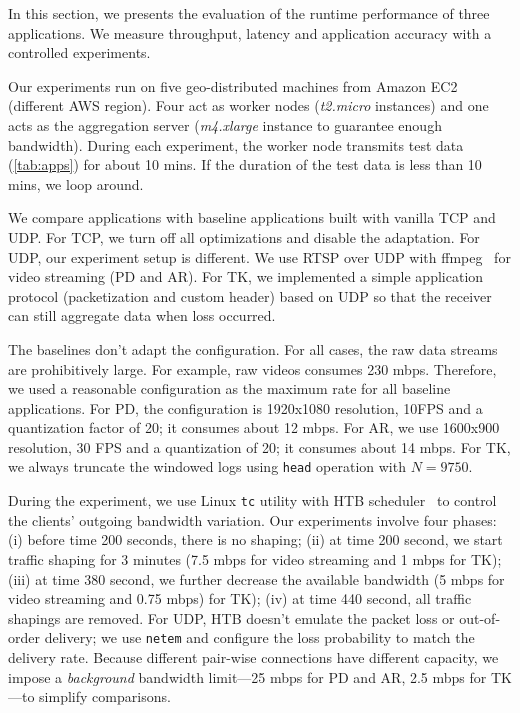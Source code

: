In this section, we presents the evaluation of the runtime performance of three
applications. We measure throughput, latency and application accuracy with a
controlled experiments.

Our experiments run on five geo-distributed machines from Amazon EC2 (different
AWS region). Four act as worker nodes (\textit{t2.micro} instances) and one acts
as the aggregation server (\textit{m4.xlarge} instance to guarantee enough
bandwidth). During each experiment, the worker node transmits test data
(\autoref{tab:apps}) for about 10 mins. If the duration of the test data is less
than 10 mins, we loop around.

We compare \sysname{} applications with baseline applications built with vanilla
TCP and UDP. For TCP, we turn off all optimizations and disable the
adaptation. For UDP, our experiment setup is different. We use RTSP over UDP
with ffmpeg~\cite{bellard2012ffmpeg} for video streaming (PD and AR). For TK, we
implemented a simple application protocol (packetization and custom header)
based on UDP so that the receiver can still aggregate data when loss occurred.

The baselines don't adapt the configuration. For all cases, the raw data streams
are prohibitively large. For example, raw videos consumes 230 mbps. Therefore,
we used a reasonable configuration as the maximum rate for all baseline
applications. For PD, the configuration is 1920x1080 resolution, 10FPS and a
quantization factor of 20; it consumes about 12 mbps. For AR, we use 1600x900
resolution, 30 FPS and a quantization of 20; it consumes about 14 mbps. For TK,
we always truncate the windowed logs using \texttt{head} operation with
$N=9750$.

During the experiment, we use Linux \texttt{tc} utility with HTB
scheduler~\cite{lartc, htb} to control the clients' outgoing bandwidth
variation. Our experiments involve four phases: (i) before time 200 seconds,
there is no shaping; (ii) at time 200 second, we start traffic shaping for 3
minutes (7.5 mbps for video streaming and 1 mbps for TK); (iii) at time 380
second, we further decrease the available bandwidth (5 mbps for video streaming
and 0.75 mbps) for TK); (iv) at time 440 second, all traffic shapings are
removed. For UDP, HTB doesn't emulate the packet loss or out-of-order delivery;
we use \texttt{netem} and configure the loss probability to match the delivery
rate. Because different pair-wise connections have different capacity, we impose
a \textit{background} bandwidth limit---25 mbps for PD and AR, 2.5 mbps for
TK---to simplify comparisons.

